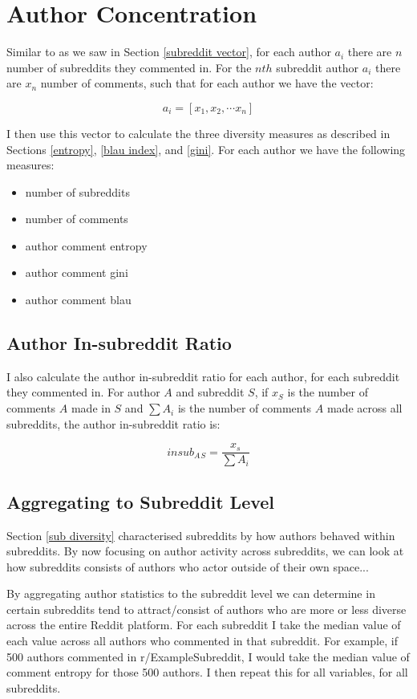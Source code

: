 \section{Author Concentration}

Similar to as we saw in Section \ref{subreddit vector}, for each author $a_i$ there are $n$ number of subreddits they commented in. For the $nth$ subreddit author $a_i$ there are $x_n$ number of comments, such that for each author we have the vector:

$$a_i = [x_1, x_2, \cdots x_n]$$

I then use this vector to calculate the three diversity measures as described in Sections \ref{entropy}, \ref{blau index}, and \ref{gini}. For each author we have the following measures:

\begin{itemize}
    \item number of subreddits
    \item number of comments
    \item author comment entropy
    \item author comment gini
    \item author comment blau
\end{itemize}


\subsection{Author In-subreddit Ratio}
I also calculate the author in-subreddit ratio for each author, for each subreddit they commented in.
For author $A$ and subreddit $S$, if $x_S$ is the number of comments $A$ made in $S$ and $\sum A_i$ is the number of comments $A$ made across all subreddits, the author in-subreddit ratio is:

$$insub_A{}_S = \frac{x_s}{\sum A_i}$$

\subsection{Aggregating to Subreddit Level}
Section \ref{sub diversity} characterised subreddits by how authors behaved within subreddits. By now focusing on author activity across subreddits, we can look at how subreddits consists of authors who actor outside of their own space...

By aggregating author statistics to the subreddit level we can determine in certain subreddits tend to attract/consist of authors who are more or less diverse across the entire Reddit platform. For each subreddit I take the median value of each value across all authors who commented in that subreddit. For example, if 500 authors commented in r/ExampleSubreddit, I would take the median value of comment entropy for those 500 authors. I then repeat this for all variables, for all subreddits.

